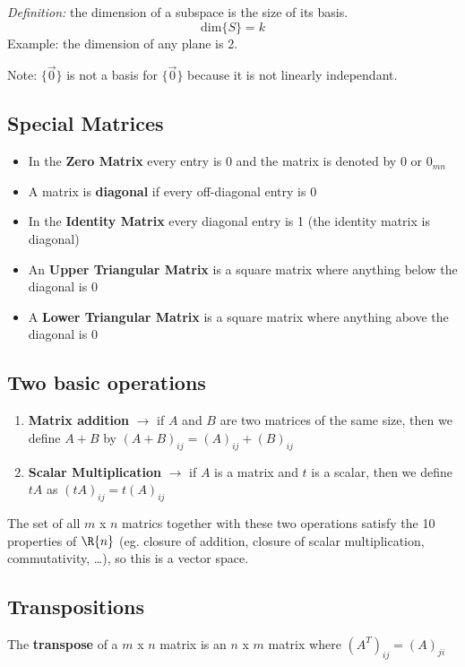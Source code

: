 \documentclass[12pt]{article}
\begin{document}

\textit{Definition:} the dimension of a subspace is the size of its basis. \[ \text{dim}\{S\} = k \]
Example: the dimension of any plane is 2.

Note: $\{\vec{0}\}$ is not a basis for $\{\vec{0}\}$ because it is not linearly independant.

\subsection*{Special Matrices}
\begin{itemize}
\item In the {\bf Zero Matrix} every entry is 0 and the matrix is denoted by 0 or $0_{mn}$
\item A matrix is {\bf diagonal} if every off-diagonal entry is 0
\item In the {\bf Identity Matrix} every diagonal entry is 1 (the identity matrix is diagonal)
\item An {\bf Upper Triangular Matrix} is a square matrix where anything below the diagonal is 0
\item A {\bf Lower Triangular Matrix} is a square matrix where anything above the diagonal is 0
\end{itemize}

\subsection*{Two basic operations}
\begin{enumerate}
\item {\bf Matrix addition} $\rightarrow$ if $A$ and $B$ are two matrices of the same size, then we define $A + B$ by $(A + B)_{ij} = (A)_{ij} + (B)_{ij}$
\item {\bf Scalar Multiplication} $\rightarrow$ if $A$ is a matrix and $t$ is a scalar, then we define $tA$ as $(tA)_{ij} = t(A)_{ij}$
\end{enumerate}

The set of all $m$ x $n$ matrics together with these two operations satisfy the 10 properties of $\R{n}$ (eg. closure of addition, closure of scalar multiplication, commutativity, \dots ), so this is a vector space.

\subsection*{Transpositions}
The {\bf transpose} of a $m$ x $n$ matrix is an $n$ x $m$ matrix where $(A^T)_{ij} = (A)_{ji}$
\end{document}
